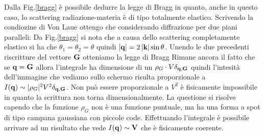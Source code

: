\documentclass[a4paper,12pt]{article}
\begin{document}
Dalla Fig.\ref{bragg} è possibile dedurre la legge di Bragg in quanto, anche in questo caso, lo scattering radiazione-materia è di tipo totalmente elastico. Scrivendo la condiozine di Von Laue ottengo che
considerando diffrazione per due piani paralleli:
Da Fig.\ref{bragg} si nota che a causa dello scattering completamente elastico si ha che $\theta_1 = \theta_2 = \theta$ quindi  $\abs{{\vet q} } = 2\abs{\vet{k} } \sin\theta$. Unendo le due precedenti riscritture del vettore $\it\bf{G}$ otteniamo la legge di Bragg
Rimane ancora il fatto che se ${\it\bf q} ={\it\bf G}$ allora l'integrale ha dimensione di un $\rho_G \cdot V \delta_{{\it\bf q},{\it\bf G}} $ quindi l'intesità dell'immagine che vediamo sullo schermo risulta proporzionale a $I({\it\bf q}) \sim |\rho_G|^2 V^2 \delta_{{\it\bf q},{\it\bf G}}$. Non può essere proporzionale a $V^2$ è fisicamente impossibile in quanto la scrittura non torna dimensionalmente. La questione si risolve capendo che la funzione $\rho_G$ non è una funzione puntuale, ma ha una forma a spot di tipo campana gaussiana con piccole code. Effettuando l'integrale
è possibile arrivare ad un risultato che vede $I(\it\bf{q})\sim V$ che è fisicamente coerente.
\end{document}
